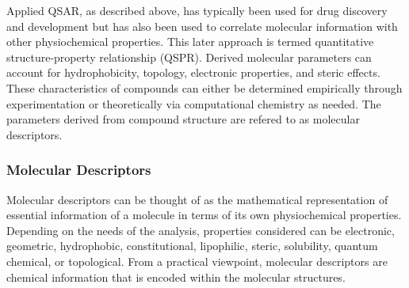 Applied QSAR, as described above, has typically been used for drug discovery and development but has also been used to correlate molecular information with other physiochemical properties. This later approach is termed quantitative structure-property relationship (QSPR). Derived molecular parameters can account for hydrophobicity, topology, electronic properties, and steric effects. These characteristics of compounds can either be determined empirically through experimentation or theoretically via computational chemistry as needed. \cite{Nantasenamat2009} The parameters derived from compound structure are refered to as molecular descriptors.




\subsubsection{Molecular Descriptors}
Molecular descriptors can be thought of as the mathematical representation of essential information of a molecule in terms of its own physiochemical properties. Depending on the needs of the analysis, properties considered can be electronic, geometric, hydrophobic, constitutional, lipophilic, steric, solubility, quantum chemical, or topological. From a practical viewpoint, molecular descriptors are chemical information that is encoded within the molecular structures. \cite{Nantasenamat2009}

